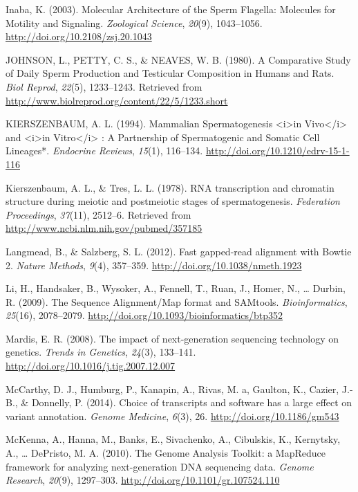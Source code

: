\documentclass[12pt,twoside]{reedthesis}
\theoremstyle{definition}
\theoremstyle{definition}
\theoremstyle{remark}
\begin{document}
  \hypertarget{ref-Inaba2003}{}
  Inaba, K. (2003). Molecular Architecture of the Sperm Flagella:
  Molecules for Motility and Signaling. \emph{Zoological Science},
  \emph{20}(9), 1043--1056. \url{http://doi.org/10.2108/zsj.20.1043}
  
  \hypertarget{ref-Johnson1980}{}
  JOHNSON, L., PETTY, C. S., \& NEAVES, W. B. (1980). A Comparative Study
  of Daily Sperm Production and Testicular Composition in Humans and Rats.
  \emph{Biol Reprod}, \emph{22}(5), 1233--1243. Retrieved from
  \url{http://www.biolreprod.org/content/22/5/1233.short}
  
  \hypertarget{ref-KIERSZENBAUM1994}{}
  KIERSZENBAUM, A. L. (1994). Mammalian Spermatogenesis
  \textless{}i\textgreater{}in Vivo\textless{}/i\textgreater{} and
  \textless{}i\textgreater{}in Vitro\textless{}/i\textgreater{} : A
  Partnership of Spermatogenic and Somatic Cell Lineages*. \emph{Endocrine
  Reviews}, \emph{15}(1), 116--134.
  \url{http://doi.org/10.1210/edrv-15-1-116}
  
  \hypertarget{ref-Kierszenbaum1978}{}
  Kierszenbaum, A. L., \& Tres, L. L. (1978). RNA transcription and
  chromatin structure during meiotic and postmeiotic stages of
  spermatogenesis. \emph{Federation Proceedings}, \emph{37}(11), 2512--6.
  Retrieved from \url{http://www.ncbi.nlm.nih.gov/pubmed/357185}
  
  \hypertarget{ref-Langmead2012}{}
  Langmead, B., \& Salzberg, S. L. (2012). Fast gapped-read alignment with
  Bowtie 2. \emph{Nature Methods}, \emph{9}(4), 357--359.
  \url{http://doi.org/10.1038/nmeth.1923}
  
  \hypertarget{ref-Li2009}{}
  Li, H., Handsaker, B., Wysoker, A., Fennell, T., Ruan, J., Homer, N.,
  \ldots{} Durbin, R. (2009). The Sequence Alignment/Map format and
  SAMtools. \emph{Bioinformatics}, \emph{25}(16), 2078--2079.
  \url{http://doi.org/10.1093/bioinformatics/btp352}
  
  \hypertarget{ref-Mardis2008}{}
  Mardis, E. R. (2008). The impact of next-generation sequencing
  technology on genetics. \emph{Trends in Genetics}, \emph{24}(3),
  133--141. \url{http://doi.org/10.1016/j.tig.2007.12.007}
  
  \hypertarget{ref-McCarthy2014}{}
  McCarthy, D. J., Humburg, P., Kanapin, A., Rivas, M. a, Gaulton, K.,
  Cazier, J.-B., \& Donnelly, P. (2014). Choice of transcripts and
  software has a large effect on variant annotation. \emph{Genome
  Medicine}, \emph{6}(3), 26. \url{http://doi.org/10.1186/gm543}
  
  \hypertarget{ref-McKenna2010}{}
  McKenna, A., Hanna, M., Banks, E., Sivachenko, A., Cibulskis, K.,
  Kernytsky, A., \ldots{} DePristo, M. A. (2010). The Genome Analysis
  Toolkit: a MapReduce framework for analyzing next-generation DNA
  sequencing data. \emph{Genome Research}, \emph{20}(9), 1297--303.
  \url{http://doi.org/10.1101/gr.107524.110}
  
\end{document}
